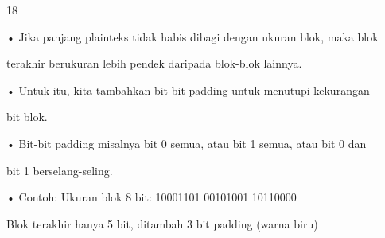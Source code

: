 \documentclass{article}
\begin{document}

18

• Jika panjang plainteks tidak habis dibagi dengan ukuran blok, maka blok 

terakhir berukuran lebih pendek daripada blok-blok lainnya. 

• Untuk itu, kita tambahkan bit-bit padding untuk menutupi kekurangan 

bit blok.

• Bit-bit padding misalnya bit 0 semua, atau bit 1 semua, atau bit 0 dan 

bit 1 berselang-seling.

• Contoh: Ukuran blok 8 bit: 10001101  00101001  10110000


Blok terakhir hanya 5 bit, ditambah 3 bit padding (warna biru)
\end{document}
